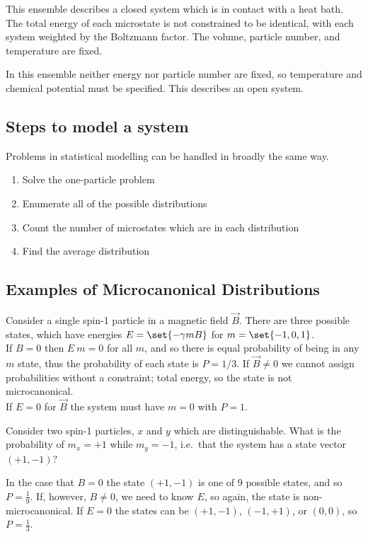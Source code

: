 \begin{definition}
  This ensemble describes a closed system which is in contact with a
  heat bath. The total energy of each microstate is not constrained to
  be identical, with each system weighted by the Boltzmann factor. The
  volume, particle number, and temperature are fixed.
\end{definition}

\begin{definition}
  In this ensemble neither energy nor particle number are fixed, so
  temperature and chemical potential must be specified. This describes
  an open system.
\end{definition}

\subsection{Steps to model a system}
\label{sec:steps-model-system}

Problems in statistical modelling can be handled in broadly the same
way.
\begin{enumerate}
\item Solve the one-particle problem
\item Enumerate all of the possible distributions
\item Count the number of microstates which are in each distribution
\item Find the average distribution
\end{enumerate}

\subsection{Examples of Microcanonical Distributions}
\label{sec:exampl-micr-distr}

\begin{example}
  Consider a single spin-1 particle in a magnetic field
  $\vec{B}$. There are three possible states, which have energies $E =
  \set{- \gamma m B}$ for $m=\set{-1, 0, 1}$.\\
  If $B=0$ then $E~{m}=0$ for all $m$, and so there is equal
  probability of being in any $m$ state, thus the probability of each
  state is $P = 1/3$. 
  If $\vec{B} \neq 0$ we cannot assign probabilities without a
  constraint;
  total energy, so the state is not microcanonical.\\
  If $E=0$ for $\vec{B}$ the system must have $m=0$ with $P=1$.
\end{example}
\begin{example}
  Consider two spin-1 particles, $x$ and $y$ which are
  distinguishable. What is the probability of $m_x=+1$ while $m_y=-1$,
  i.e.~that the system has a state vector $(+1, -1)$?

  In the case that $B=0$ the state $(+1, -1)$ is one of 9 possible
  states, and so $P=\frac{1}{9}$. If, however, $B\neq 0$, we need to
  know $E$, so again, the state is non-microcanonical. If $E=0$ the
  states can be $(+1, -1)$, $(-1, +1)$, or $(0,0)$, so
  $P=\frac{1}{3}$.
\end{example}

